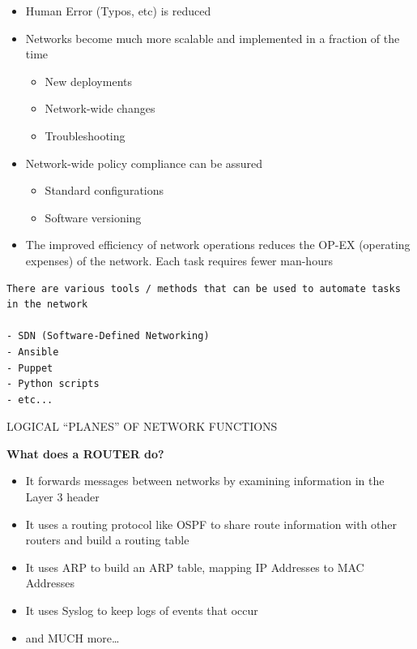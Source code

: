 \begin{itemize}
\tightlist
\item
  Human Error (Typos, etc) is reduced
\item
  Networks become much more scalable and implemented in a fraction of
  the time

  \begin{itemize}
  \tightlist
  \item
    New deployments
  \item
    Network-wide changes
  \item
    Troubleshooting
  \end{itemize}
\item
  Network-wide policy compliance can be assured

  \begin{itemize}
  \tightlist
  \item
    Standard configurations
  \item
    Software versioning
  \end{itemize}
\item
  The improved efficiency of network operations reduces the OP-EX
  (operating expenses) of the network. Each task requires fewer
  man-hours
\end{itemize}

\begin{lstlisting}
There are various tools / methods that can be used to automate tasks in the network

- SDN (Software-Defined Networking)
- Ansible
- Puppet
- Python scripts
- etc...
\end{lstlisting}

LOGICAL ``PLANES'' OF NETWORK FUNCTIONS

\textbf{What does a ROUTER do?}

\begin{itemize}
\tightlist
\item
  It forwards messages between networks by examining information in the
  Layer 3 header
\item
  It uses a routing protocol like OSPF to share route information with
  other routers and build a routing table
\item
  It uses ARP to build an ARP table, mapping IP Addresses to MAC
  Addresses
\item
  It uses Syslog to keep logs of events that occur
\item
  and MUCH more\ldots{}
\end{itemize}

